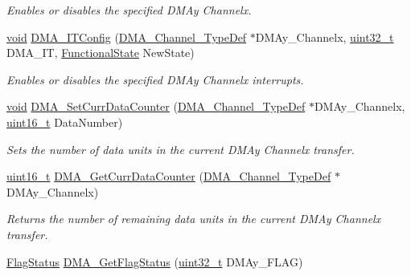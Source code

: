 \begin{DoxyCompactItemize}
\begin{DoxyCompactList}\small\item\em Enables or disables the specified D\+M\+Ay Channelx. \end{DoxyCompactList}\item 
\hyperlink{usb__devapi_8h_afabf60e7f57651d6d595a02c75f07cd0}{void} \hyperlink{group___d_m_a___exported___functions_ga0bb60360be9cd57f96399be2f3b5eb2b}{D\+M\+A\+\_\+\+I\+T\+Config} (\hyperlink{struct_d_m_a___channel___type_def}{D\+M\+A\+\_\+\+Channel\+\_\+\+Type\+Def} $\ast$D\+M\+Ay\+\_\+\+Channelx, \hyperlink{_p_e___types_8h_a33594304e786b158f3fb30289278f5af}{uint32\+\_\+t} D\+M\+A\+\_\+\+IT, \hyperlink{agilefox_2library_2inc_2stm32f10x__type_8h_ac9a7e9a35d2513ec15c3b537aaa4fba1}{Functional\+State} New\+State)
\begin{DoxyCompactList}\small\item\em Enables or disables the specified D\+M\+Ay Channelx interrupts. \end{DoxyCompactList}\item 
\hyperlink{usb__devapi_8h_afabf60e7f57651d6d595a02c75f07cd0}{void} \hyperlink{group___d_m_a___exported___functions_gade5d9e532814eaa46514cb385fdff709}{D\+M\+A\+\_\+\+Set\+Curr\+Data\+Counter} (\hyperlink{struct_d_m_a___channel___type_def}{D\+M\+A\+\_\+\+Channel\+\_\+\+Type\+Def} $\ast$D\+M\+Ay\+\_\+\+Channelx, \hyperlink{_p_e___types_8h_a1f1825b69244eb3ad2c7165ddc99c956}{uint16\+\_\+t} Data\+Number)
\begin{DoxyCompactList}\small\item\em Sets the number of data units in the current D\+M\+Ay Channelx transfer. \end{DoxyCompactList}\item 
\hyperlink{_p_e___types_8h_a1f1825b69244eb3ad2c7165ddc99c956}{uint16\+\_\+t} \hyperlink{group___d_m_a___exported___functions_ga511b4c402d1ff32d53f28736956cac5d}{D\+M\+A\+\_\+\+Get\+Curr\+Data\+Counter} (\hyperlink{struct_d_m_a___channel___type_def}{D\+M\+A\+\_\+\+Channel\+\_\+\+Type\+Def} $\ast$D\+M\+Ay\+\_\+\+Channelx)
\begin{DoxyCompactList}\small\item\em Returns the number of remaining data units in the current D\+M\+Ay Channelx transfer. \end{DoxyCompactList}\item 
\hyperlink{agilefox_2library_2inc_2stm32f10x__type_8h_a89136caac2e14c55151f527ac02daaff}{Flag\+Status} \hyperlink{group___d_m_a___exported___functions_gafb30b7a891834c267eefd5d30b688a9f}{D\+M\+A\+\_\+\+Get\+Flag\+Status} (\hyperlink{_p_e___types_8h_a33594304e786b158f3fb30289278f5af}{uint32\+\_\+t} D\+M\+Ay\+\_\+\+F\+L\+AG)

\end{DoxyCompactItemize}
